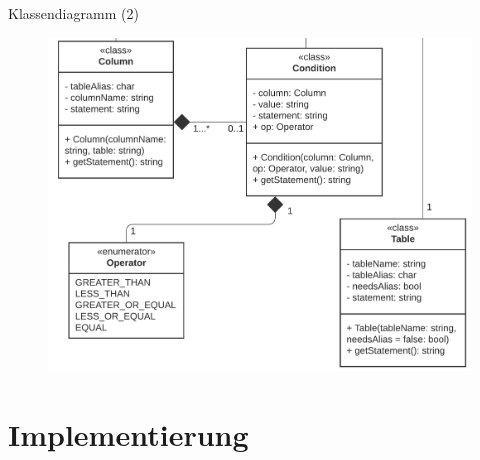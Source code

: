 \documentclass[toc]{beamer}
\begin{document}
        \begin{frame}{Klassendiagramm (2)}
        
        
            \begin{figure}[htp]
                   \includegraphics[scale=0.15]{UML-Klasse_crop.png}
                    
                    \end{figure}
        \end{frame}
        
\section{Implementierung}
\end{document}
